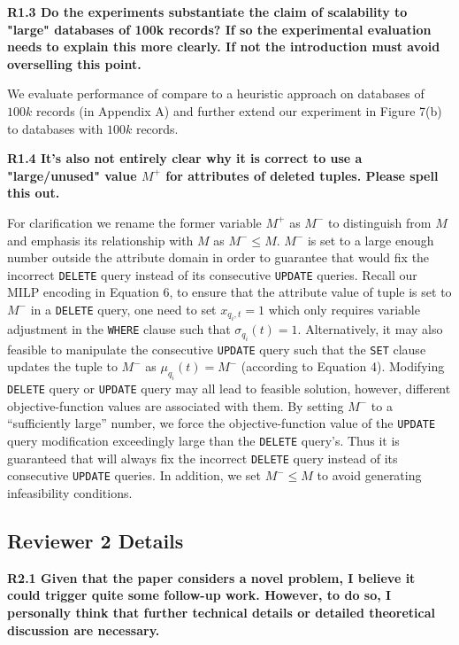 \noindent \textbf{R1.3 Do the experiments substantiate the claim of scalability to "large" databases of 100k records? If so the experimental evaluation needs to explain this more clearly. If not the introduction must avoid overselling this point.}

We evaluate performance of \sys compare to a heuristic approach on databases of $100k$ records (in Appendix A) and further extend our experiment in Figure 7(b) to databases with $100k$ records. 

\noindent \textbf{R1.4 It's also not entirely clear why it is correct to use a "large/unused" value $M^+$ for attributes of deleted tuples. Please spell this out.}

For clarification we rename the former variable $M^+$ as $M^-$ to distinguish from $M$ and emphasis its relationship with $M$ as $M^- \leq M$. 
$M^-$ is set to a large enough number outside the attribute domain in order to guarantee that \sys would fix the incorrect \texttt{DELETE} query instead of its consecutive \texttt{UPDATE} queries. Recall our MILP encoding in Equation 6, to ensure that the attribute value of tuple is set to $M^-$ in a \texttt{DELETE} query, one need to set $x_{q_i,t} = 1$ which only requires variable adjustment in the \texttt{WHERE} clause such that $\sigma_{q_i}(t) = 1$. Alternatively, it may also feasible to manipulate the consecutive \texttt{UPDATE} query such that the \texttt{SET} clause updates the tuple to $M^-$ as $\mu_{q_i}(t) = M^-$ (according to Equation 4). Modifying \texttt{DELETE} query or \texttt{UPDATE} query may all lead to feasible solution, however, different objective-function values are associated with them. By setting $M^-$ to a ``sufficiently large'' number, we force the objective-function value of the \texttt{UPDATE} query modification exceedingly large than the \texttt{DELETE} query's. Thus it is  guaranteed that \sys will always fix the incorrect \texttt{DELETE} query instead of its consecutive \texttt{UPDATE} queries. In addition, we set $M^- \leq M$ to avoid generating infeasibility conditions.

\subsection*{Reviewer 2 Details} 

\noindent \textbf{R2.1 Given that the paper considers a novel problem, I believe it could trigger quite some follow-up work. However, to do so, I personally think that further technical details or detailed theoretical discussion are necessary. }

